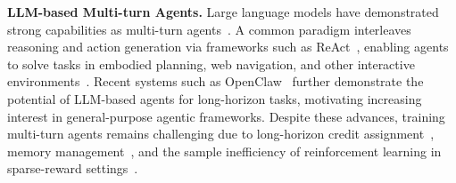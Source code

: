 \documentclass{article} %
\begin{document}
\textbf{LLM-based Multi-turn Agents.}
Large language models have demonstrated strong capabilities as multi-turn agents~\citep{openai2024gpt4technicalreport,yang2025qwen3technicalreport}. 
A common paradigm interleaves reasoning and action generation via frameworks such as ReAct~\citep{yao2022react}, enabling agents to solve tasks in embodied planning, web navigation, and other interactive environments~\citep{shridhar2020alfworld,yao2022webshop,wang2022scienceworld,merrill2026terminal,cli_anything,li2026skillsbench}.
Recent systems such as OpenClaw~\citep{wang2026openclaw,openclaw} further demonstrate the potential of LLM-based agents for long-horizon tasks, motivating increasing interest in general-purpose agentic frameworks.
Despite these advances, training multi-turn agents remains challenging due to long-horizon credit assignment~\citep{Guo_2025}, memory management~\citep{shi2026r}, and the sample inefficiency of reinforcement learning in sparse-reward settings~\citep{feng2025groupingrouppolicyoptimizationllm,penaloza2026privileged}.
\end{document}
